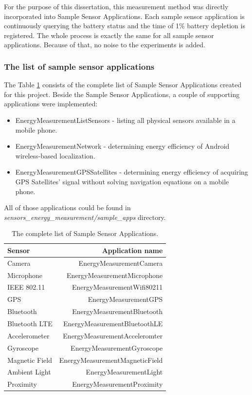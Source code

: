 For the purpose of this dissertation, this measurement method was directly incorporated into Sample Sensor Applications. Each sample sensor application is continuously querying the battery status and the time of 1\% battery depletion is registered. The whole process is exactly the same for all sample sensor applications. Because of that, no noise to the experiments is added.

\subsubsection{The list of sample sensor applications}	
\label{s:design:measurements:applications}
\hspace{10pt} The Table \ref{table:samplesensorapps} consists of the complete list of Sample Sensor Applications created for this project. Beside the Sample Sensor Applications, a couple of supporting applications were implemented:
\begin{itemize}
	\item EnergyMeasurementListSensors - listing all physical sensors available in a mobile phone.
	\item EnergyMeasurementNetwork - determining energy efficiency of Android wireless-based localization.
	\item EnergyMeasurementGPSSatellites - determining energy efficiency of acquiring GPS Satellites' signal without solving navigation equations on a mobile phone.	
\end{itemize}
All of those applications could be found in \textit{sensors\_energy\_measurement/sample\_apps} directory.
		
\begin{table}[H]
	\centering
    \begin{tabular}{| l | r | }
    \hline
    \textbf{Sensor} & \textbf{Application name} \\ \hline
    Camera & EnergyMeasurementCamera \\ \hline
    Microphone & EnergyMeasurementMicrophone \\\hline
    IEEE 802.11 & EnergyMeasurementWifi80211 \\ \hline
    GPS & EnergyMeasurementGPS \\ \hline
    Bluetooth & EnergyMeasurementBluetooth \\ \hline
    Bluetooth LTE & EnergyMeasurementBluetoothLE \\ \hline
    Accelerometer & EnergyMeasurementAcceleromter \\ \hline
    Gyroscope & EnergyMeasurementGyroscope \\ \hline
    Magnetic Field & EnergyMeasurementMagneticField\\ \hline
    Ambient Light & EnergyMeasurementLight \\ \hline
    Proximity & EnergyMeasurementProximity \\ \hline
    \end{tabular}
    \caption{The complete list of Sample Sensor Applications.}
	\label{table:samplesensorapps}
\end{table}			


